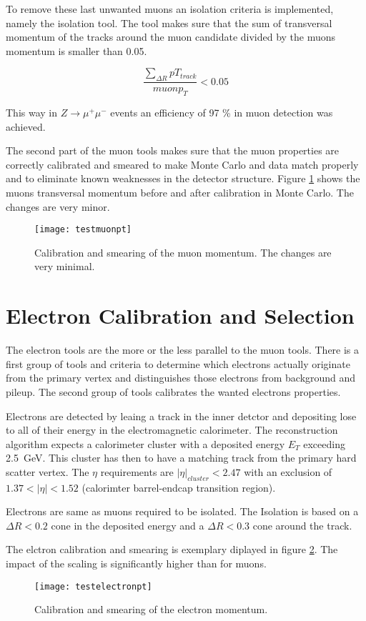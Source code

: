 To remove these last unwanted muons an isolation criteria is implemented, namely the isolation tool. The tool makes sure that the sum of transversal momentum of the tracks around the muon candidate divided by the muons momentum is smaller than \num{0.05}. 

\begin{equation}
\frac{\sum_{\Delta R}pT_{track}}{muon p_T} < 0.05
\end{equation}

This way in $Z \rightarrow \mu^+ \mu^-$ events an efficiency of \num{97} \% in muon detection was achieved.

The second part of the muon tools makes sure that the muon properties are correctly calibrated and smeared to make Monte Carlo and data match properly and to eliminate known weaknesses in the detector structure. Figure \ref{fig:testmuonpt} shows the muons transversal momentum before and after calibration in Monte Carlo. The changes are very minor.

\begin{figure}[h]
\centering
\texttt{[image: testmuonpt]}
\caption{Calibration and smearing of the muon momentum. The changes are very minimal.}
\label{fig:testmuonpt}
\end{figure}

\section{Electron Calibration and Selection}

The electron tools are the more or the less parallel to the muon tools. There is a first group of tools and criteria to determine which electrons actually originate from the primary vertex and distinguishes those electrons from background and pileup. The second group of tools calibrates the wanted electrons properties.

Electrons are detected by leaing a track in the inner detctor and depositing lose to all of their energy in the electromagnetic calorimeter. The reconstruction algorithm expects a calorimeter cluster with a deposited energy $E_T$ exceeding \SI{2.5}{\GeV}. This cluster has then to have a matching track from the primary hard scatter vertex. The $\eta$ requirements are $|\eta|_{cluster} < 2.47$ with an exclusion of $\num{1.37} < |\eta| < \num{1.52}$ (calorimter barrel-endcap transition region).

Electrons are same as muons required to be isolated. The Isolation is based on a $\Delta R < \num{0.2}$ cone in the deposited energy and a $\Delta R < \num{0.3}$ cone around the track.

The elctron calibration and smearing is exemplary diplayed in figure \ref{fig:testelectronpt}. The impact of the scaling is significantly higher than for muons.

\begin{figure}
\centering
\texttt{[image: testelectronpt]}
\caption{Calibration and smearing of the electron momentum.}
\label{fig:testelectronpt}
\end{figure}